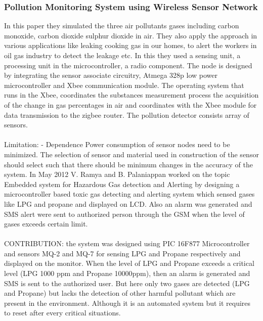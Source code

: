 \subsubsection{Pollution Monitoring System using Wireless Sensor Network}
In this paper they simulated the three air pollutants gases including carbon monoxide, carbon dioxide sulphur dioxide in air. They also apply the approach in various applications like leaking cooking gas in our homes, to alert the workers in oil gas industry to detect the leakage etc. In this they used a sensing unit, a processing unit in the microcontroller, a radio component. The node is designed by integrating the sensor associate circuitry, Atmega 328p low power microcontroller and Xbee communication module. The operating system that runs in the Xbee, coordinates the substances measurement process the acquisition of the change in gas percentages in air and coordinates with the Xbee module for data transmission to the zigbee router. The pollution detector consists array of sensors. 
\\
\\
Limitation: - Dependence Power consumption of sensor nodes need to be minimized. The selection of sensor and material used in construction of the sensor should select such that there should be minimum changes in the accuracy of the system. In May 2012 V. Ramya and B. Palaniappan worked on the topic Embedded system for Hazardous Gas detection and Alerting by designing a microcontroller based toxic gas detecting and alerting system which sensed gases like LPG and propane and displayed on LCD. Also an alarm was generated and SMS alert were sent to authorized person through the GSM when the level of gases exceeds certain limit.
\\
\\
CONTRIBUTION: the system was designed using PIC 16F877 Microcontroller and sensors MQ-2 and MQ-7 for sensing LPG and Propane respectively and displayed on the monitor. When the level of LPG and Propane exceeds a critical level (LPG 1000 ppm and Propane 10000ppm), then an alarm is generated and SMS is sent to the authorized user. But here only two gases are detected (LPG and Propane) but lacks the detection of other harmful pollutant which are present in the environment. Although it is an automated system but it requires to reset after every critical situations.

